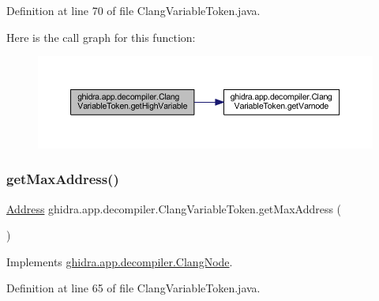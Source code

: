 Definition at line 70 of file Clang\+Variable\+Token.\+java.

Here is the call graph for this function\+:
\nopagebreak
\begin{figure}[H]
\begin{center}
\leavevmode
\includegraphics[width=350pt]{classghidra_1_1app_1_1decompiler_1_1_clang_variable_token_a718ec8cced1a9f92ceb304d63c549613_cgraph}
\end{center}
\end{figure}
\mbox{\label{classghidra_1_1app_1_1decompiler_1_1_clang_variable_token_a4a0d312a05e4e104f00e0433da2e1134}} 
\subsubsection{\texorpdfstring{getMaxAddress()}{getMaxAddress()}}
{\footnotesize\ttfamily \mbox{\hyperlink{class_address}{Address}} ghidra.\+app.\+decompiler.\+Clang\+Variable\+Token.\+get\+Max\+Address (\begin{DoxyParamCaption}{ }\end{DoxyParamCaption})\hspace{0.3cm}{\ttfamily [inline]}}



Implements \mbox{\hyperlink{interfaceghidra_1_1app_1_1decompiler_1_1_clang_node_a91e8beccce17b875e07d7c0747b43a97}{ghidra.\+app.\+decompiler.\+Clang\+Node}}.



Definition at line 65 of file Clang\+Variable\+Token.\+java.

\mbox{\label{classghidra_1_1app_1_1decompiler_1_1_clang_variable_token_a655defda8c1c17f607fdddb356e51b6b}} 
